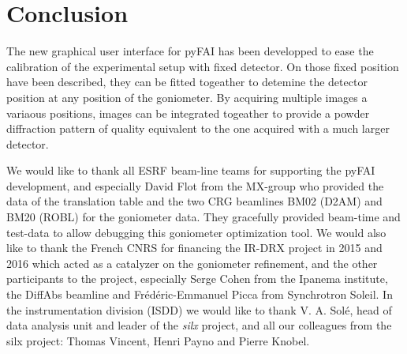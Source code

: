 \documentclass[preprint]{iucr}              %
\begin{document}
\section{Conclusion}

The new graphical user interface for pyFAI has been developped to ease the
calibration of the experimental setup with fixed detector. 
On those fixed position have been described, they can be fitted togeather to
detemine the detector position at any position of the goniometer. 
By acquiring multiple images a variaous positions, images can be
integrated togeather to provide a powder diffraction pattern of
quality equivalent to the one acquired with a much larger detector. 



 

We would like to thank all ESRF beam-line teams for supporting the
pyFAI development, and especially David Flot from the MX-group who provided the
data of the translation table and the two CRG beamlines BM02 (D2AM) and BM20
(ROBL) for the goniometer data. 
They gracefully provided beam-time and test-data to allow debugging this 
goniometer optimization tool.
We would also like to thank the French CNRS for financing the IR-DRX project
in 2015 and 2016 which acted as a catalyzer on the goniometer refinement,
and the other participants to the project, especially Serge Cohen from the
Ipanema institute, the DiffAbs beamline and Frédéric-Emmanuel Picca from
Synchrotron Soleil.
In the instrumentation division (ISDD) we would like to thank V. A. Solé,  head
of data analysis unit and leader of the \textit{silx} project, and all our
colleagues from the silx project: Thomas Vincent, Henri Payno and Pierre Knobel.
\end{document}
